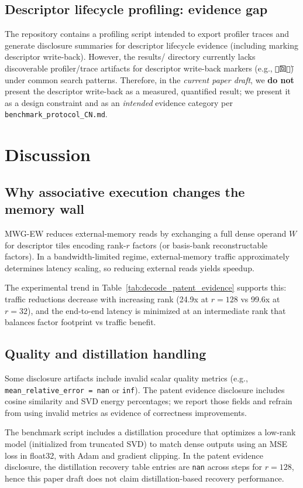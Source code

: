 \documentclass[11pt]{article}
\begin{document}
\subsection{Descriptor lifecycle profiling: evidence gap}
The repository contains a profiling script intended to export profiler traces and generate disclosure summaries for descriptor lifecycle evidence (including marking descriptor write-back). However, the results/ directory currently lacks discoverable profiler/trace artifacts for descriptor write-back markers (e.g., \texttt{\"未回写\"}) under common search patterns. 
Therefore, in the 
\emph{current paper draft}, we 
\textbf{do not} present the descriptor write-back as a measured, quantified result; we present it as a design constraint and as an 
\emph{intended} evidence category per \texttt{benchmark\_protocol\_CN.md}.

\section{Discussion}
\subsection{Why associative execution changes the memory wall}
MWG-EW reduces external-memory reads by exchanging a full dense operand $W$ for descriptor tiles encoding rank-$r$ factors (or basis-bank reconstructable factors). In a bandwidth-limited regime, external-memory traffic approximately determines latency scaling, so reducing external reads yields speedup.

The experimental trend in Table~\ref{tab:decode_patent_evidence} supports this: traffic reductions decrease with increasing rank (24.9x at $r=128$ vs 99.6x at $r=32$), and the end-to-end latency is minimized at an intermediate rank that balances factor footprint vs traffic benefit.

\subsection{Quality and distillation handling}
Some disclosure artifacts include invalid scalar quality metrics (e.g., \texttt{mean\_relative\_error = nan} or \texttt{inf}). The patent evidence disclosure includes cosine similarity and SVD energy percentages; we report those fields and refrain from using invalid metrics as evidence of correctness improvements.

The benchmark script includes a distillation procedure that optimizes a low-rank model (initialized from truncated SVD) to match dense outputs using an MSE loss in float32, with Adam and gradient clipping. In the patent evidence disclosure, the distillation recovery table entries are \texttt{nan} across steps for $r=128$, hence this paper draft does not claim distillation-based recovery performance.
\end{document}
